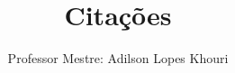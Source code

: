 \documentclass[compress, hyperref={pdfpagelayout=SinglePage}]{beamer}
\title[TCC II - Aula 04]{Citações}
\author{Professor Mestre: Adilson Lopes Khouri}
\begin{document}
	
	\begin{frame}
		\titlepage
	\end{frame}
	
	
	
	

	
	
	
		
	
	
	
	
\end{document}
